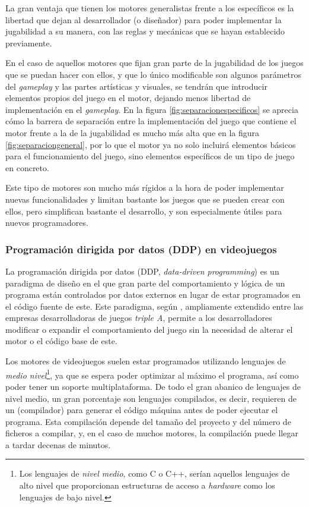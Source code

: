 \smallskip

La gran ventaja que tienen los motores generalistas frente a los específicos es la libertad que dejan al desarrollador (o diseñador) para poder implementar la jugabilidad a su manera, con las reglas y mecánicas que se hayan establecido previamente.

\medskip

En el caso de aquellos motores que fijan gran parte de la jugabilidad de los juegos que se puedan hacer con ellos, y que lo único modificable son algunos parámetros del \textit{gameplay} y las partes artísticas y visuales, se tendrán que introducir elementos propios del juego en el motor, dejando menos libertad de implementación en el \textit{gameplay}. En la figura \ref{fig:separacionespecificos} se aprecia cómo la barrera de separación entre la implementación del juego que contiene el motor frente a la de la jugabilidad es mucho más alta que en la figura \ref{fig:separaciongeneral}, por lo que el motor ya no solo incluirá elementos básicos para el funcionamiento del juego, sino elementos específicos de un tipo de juego en concreto.

\smallskip

Este tipo de motores son mucho más rígidos a la hora de poder implementar nuevas funcionalidades y limitan bastante los juegos que se pueden crear con ellos, pero simplifican bastante el desarrollo, y son especialmente útiles para nuevos programadores.

\subsubsection{Programación dirigida por datos (DDP) en videojuegos}
La programación dirigida por datos (DDP, \textit{data-driven programming}) es un paradigma de diseño en el que gran parte del comportamiento y lógica de un programa están controlados por datos externos en lugar de estar programados en el código fuente de este. Este paradigma, según \citeauthor{gregory2018game}, ampliamente extendido entre las empresas desarrolladoras de juegos \textit{triple A}, permite a los desarrolladores modificar o expandir el comportamiento del juego sin la necesidad de alterar el motor o el código base de este.

\medskip

Los motores de videojuegos suelen estar programados utilizando lenguajes de \textit{medio nivel}\footnote{Los lenguajes de \textit{nivel medio}, como C o C++, serían aquellos lenguajes de alto nivel que proporcionan estructuras de acceso a \textit{hardware} como los lenguajes de bajo nivel.}, ya que se espera poder optimizar al máximo el programa, así como poder tener un soporte multiplataforma. De todo el gran abanico de lenguajes de nivel medio, un gran porcentaje son lenguajes compilados, es decir, requieren de un  (compilador) para generar el código máquina antes de poder ejecutar el programa. Esta compilación depende del tamaño del proyecto y del número de ficheros a compilar, y, en el caso de muchos motores, la compilación puede llegar a tardar decenas de minutos.


